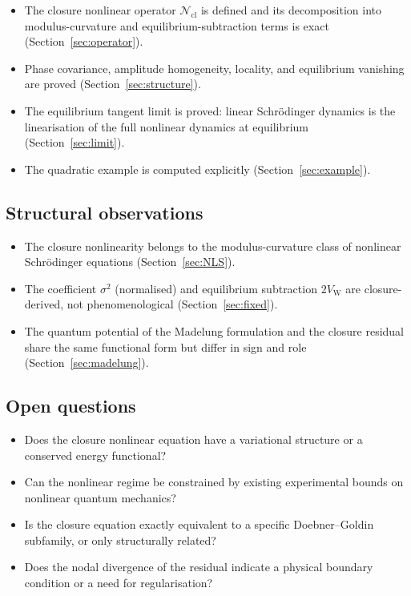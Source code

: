\documentclass[12pt]{article}
\newcommand{\Ncl}{\mathcal{N}_{\mathrm{cl}}}
\newcommand{\VW}{V_{\mathrm{W}}}
\begin{document}
\begin{itemize}
    \item The closure nonlinear operator $\Ncl$ is defined and its decomposition into modulus-curvature and equilibrium-subtraction terms is exact (Section~\ref{sec:operator}).
    \item Phase covariance, amplitude homogeneity, locality, and equilibrium vanishing are proved (Section~\ref{sec:structure}).
    \item The equilibrium tangent limit is proved: linear Schr\"odinger dynamics is the linearisation of the full nonlinear dynamics at equilibrium (Section~\ref{sec:limit}).
    \item The quadratic example is computed explicitly (Section~\ref{sec:example}).
\end{itemize}

\subsection{Structural observations}

\begin{itemize}
    \item The closure nonlinearity belongs to the modulus-curvature class of nonlinear Schr\"odinger equations (Section~\ref{sec:NLS}).
    \item The coefficient $\sigma^2$ (normalised) and equilibrium subtraction $2\VW$ are closure-derived, not phenomenological (Section~\ref{sec:fixed}).
    \item The quantum potential of the Madelung formulation and the closure residual share the same functional form but differ in sign and role (Section~\ref{sec:madelung}).
\end{itemize}

\subsection{Open questions}

\begin{itemize}
    \item Does the closure nonlinear equation have a variational structure or a conserved energy functional?
    \item Can the nonlinear regime be constrained by existing experimental bounds on nonlinear quantum mechanics?
    \item Is the closure equation exactly equivalent to a specific Doebner--Goldin subfamily, or only structurally related?
    \item Does the nodal divergence of the residual indicate a physical boundary condition or a need for regularisation?
\end{itemize}
\end{document}
